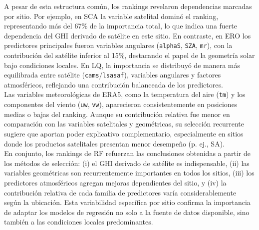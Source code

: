 A pesar de esta estructura común, los rankings revelaron dependencias marcadas por sitio. Por ejemplo, en SCA la variable satelital dominó el ranking, representando más del 67\% de la importancia total, lo que indica una fuerte dependencia del GHI derivado de satélite en este sitio. En contraste, en ERO los predictores principales fueron variables angulares (\texttt{alphaS}, \texttt{SZA}, \texttt{mr}), con la contribución del satélite inferior al 15\%, destacando el papel de la geometría solar bajo condiciones locales. En LQ, la importancia se distribuyó de manera más equilibrada entre satélite (\texttt{cams}/\texttt{lsasaf}), variables angulares y factores atmosféricos, reflejando una contribución balanceada de los predictores.\\

Las variables meteorológicas de ERA5, como la temperatura del aire (\texttt{tm}) y los componentes del viento (\texttt{uw}, \texttt{vw}), aparecieron consistentemente en posiciones medias o bajas del ranking. Aunque su contribución relativa fue menor en comparación con las variables satelitales y geométricas, su selección recurrente sugiere que aportan poder explicativo complementario, especialmente en sitios donde los productos satelitales presentan menor desempeño (p. ej., SA).\\

En conjunto, los rankings de RF refuerzan las conclusiones obtenidas a partir de los métodos de selección: (i) el GHI derivado de satélite es indispensable, (ii) las variables geométricas son recurrentemente importantes en todos los sitios, (iii) los predictores atmosféricos agregan mejoras dependientes del sitio, y (iv) la contribución relativa de cada familia de predictores varía considerablemente según la ubicación. Esta variabilidad específica por sitio confirma la importancia de adaptar los modelos de regresión no solo a la fuente de datos disponible, sino también a las condiciones locales predominantes.\\


